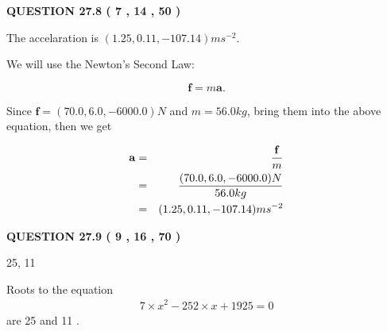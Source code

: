 \documentclass[12pt]{article}
\begin{document}
 
 
 
 
\noindent{}

 
 
  
\vspace{0.2in}
  
{\textbf{\Large{QUESTION
27.8 
 (           7 ,          14 ,          50 )
}}}
  
  
 
 
\noindent{}
 
 
  The accelaration is $  %
(
1.25,
0.11,
-107.14)
ms^{-2} $.
 
 
 
 
 
 
\noindent{}

We will use the Newton's Second Law:
 
\[
\mathbf{f}=m\mathbf{a}.
\]
 
Since $\mathbf{f}= %
(70.0 , 6.0 , -6000.0) N$
and $m= %
56.0kg$, bring them into the above equation, then we get
 
\begin{eqnarray*}
\mathbf{a}&=&\frac{\mathbf{f}}m  \\
&=&\frac{ %
(70.0 , 6.0 , -6000.0) N}{ %
56.0kg}  \\
&=& %
(1.25 , 0.11 , -107.14) ms^{-2}
\end{eqnarray*}
 
 
 
  
\vspace{0.2in}
  
{\textbf{\Large{QUESTION
27.9 
 (           9 ,          16 ,          70 )
}}}
  
  


 
 
\noindent{}

25,  %
11
 
 
 
 
 
\noindent{}

Roots to the equation
\begin{eqnarray*}
7 \times x^2  %
-252
                 \times x    %
+  %
1925 =0
\end{eqnarray*}
are  %
25 and  %
11 .
 
\end{document}
